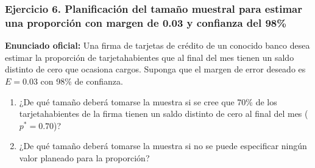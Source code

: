 {\subsubsection*{Ejercicio 6. Planificación del tamaño muestral para estimar una proporción con margen de 0.03 y confianza del 98\%}
\textbf{Enunciado oficial:} Una firma de tarjetas de crédito de un conocido banco desea estimar la proporción de tarjetahabientes que al final del mes tienen un saldo distinto de cero que ocasiona cargos. Suponga que el margen de error deseado es $E = 0.03$ con 98\% de confianza.
\begin{enumerate}
  \item[a)] ¿De qué tamaño deberá tomarse la muestra si se cree que 70\% de los tarjetahabientes de la firma tienen un saldo distinto de cero al final del mes ($p^* = 0.70$)?
  \item[b)] ¿De qué tamaño deberá tomarse la muestra si no se puede especificar ningún valor planeado para la proporción?
\end{enumerate}

}
